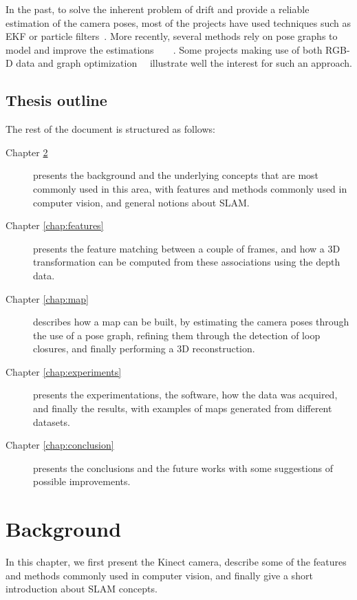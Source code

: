 In the past, to solve the inherent problem of drift and provide a reliable estimation of the camera poses, most of the projects have used techniques such as \gls{EKF} or particle filters~\cite{Thrun_2005}. More recently, several methods rely on pose graphs to model and improve the estimations~\cite{Thrun05_GraphSLAM}~\cite{grisetti07rss}~\cite{g2o_2011}~\cite{hogman_2010}. Some projects making use of both RGB-D data and graph optimization~\cite{Henry_RGBD_2010}~\cite{engelhard11euron-workshop} illustrate well the interest for such an approach.

\clearpage
\section{Thesis outline}

The rest of the document is structured as follows:
\begin{description}
\item[Chapter \ref{chap:background}] presents the background and the underlying concepts that are most commonly used in this area, with features and methods commonly used in computer vision, and general notions about SLAM.
\item[Chapter \ref{chap:features}] presents the feature matching between a couple of frames, and how a 3D transformation can be computed from these associations using the depth data.
\item[Chapter \ref{chap:map}] describes how a map can be built, by estimating the camera poses through the use of a pose graph, refining them through the detection of loop closures, and finally performing a 3D reconstruction.
\item[Chapter \ref{chap:experiments}] presents the experimentations, the software, how the data was acquired, and finally the results, with examples of maps generated from different datasets.
\item[Chapter \ref{chap:conclusion}] presents the conclusions and the future works with some suggestions of possible improvements.
\end{description}

\chapter{Background}
\label{chap:background}

In this chapter, we first present the Kinect camera, describe some of the features and methods commonly used in computer vision, and finally give a short introduction about SLAM concepts.


